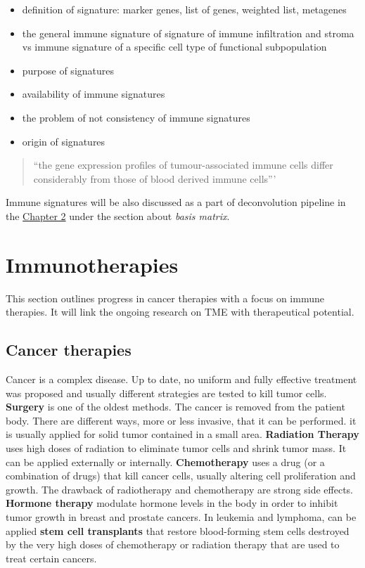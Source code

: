 \documentclass[12pt,]{book}
\providecommand{\tightlist}{%
  \setlength{\itemsep}{0pt}\setlength{\parskip}{0pt}}
\theoremstyle{definition}
\theoremstyle{definition}
\theoremstyle{definition}
\theoremstyle{remark}
\begin{document}
\begin{itemize}
\tightlist
\item
  definition of signature: marker genes, list of genes, weighted list,
  metagenes
\item
  the general immune signature of signature of immune infiltration and
  stroma vs immune signature of a specific cell type of functional
  subpopulation
\item
  purpose of signatures
\item
  availability of immune signatures
\item
  the problem of not consistency of immune signatures
\item
  origin of signatures
\end{itemize}

\begin{quote}
``the gene expression profiles of tumour-associated immune cells differ
considerably from those of blood derived immune cells'''
\citep{Schelker2017}
\end{quote}

Immune signatures will be also discussed as a part of deconvolution
pipeline in the \protect\hyperlink{methods}{Chapter 2} under the section
about \emph{basis matrix}.

\hypertarget{immunotherapies}{%
\section{Immunotherapies}\label{immunotherapies}}

This section outlines progress in cancer therapies with a focus on
immune therapies. It will link the ongoing research on TME with
therapeutical potential.

\hypertarget{cancer_Therapies}{%
\subsection{Cancer therapies}\label{cancer_Therapies}}

Cancer is a complex disease. Up to date, no uniform and fully effective
treatment was proposed and usually different strategies are tested to
kill tumor cells. \textbf{Surgery} is one of the oldest methods. The
cancer is removed from the patient body. There are different ways, more
or less invasive, that it can be performed. it is usually applied for
solid tumor contained in a small area. \textbf{Radiation Therapy} uses
high doses of radiation to eliminate tumor cells and shrink tumor mass.
It can be applied externally or internally. \textbf{Chemotherapy} uses a
drug (or a combination of drugs) that kill cancer cells, usually
altering cell proliferation and growth. The drawback of radiotherapy and
chemotherapy are strong side effects. \textbf{Hormone therapy } modulate
hormone levels in the body in order to inhibit tumor growth in breast
and prostate cancers. In leukemia and lymphoma, can be applied
\textbf{stem cell transplants} that restore blood-forming stem cells
destroyed by the very high doses of chemotherapy or radiation therapy
that are used to treat certain cancers.
\end{document}
